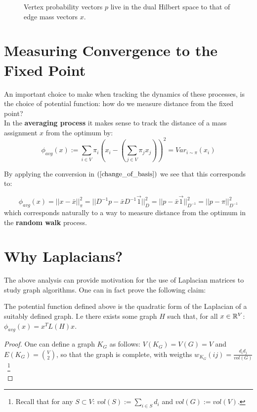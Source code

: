 \begin{figure}[h]
    \centering
    \caption{Vertex probability vectors $p$ live in the dual Hilbert space to that of edge mass vectors $x$.}
    \label{fig:my_label}
\end{figure}
\section{Measuring Convergence to the Fixed Point}
An important choice to make when tracking the dynamics of these processes, is the choice of potential function: how do we measure distance from the fixed point?\\

\noindent
In the \textbf{averaging process} it makes sense to track the distance of a mass assignment $x$ from the optimum by:
\[
    \phi_{avg}(x):= \sum_{i\in V} \pi_i \left(x_i - (\sum_{j \in V} \pi_j x_j)\right)^2 = Var_{i \sim \pi}(x_i)
\]

\noindent
By applying the conversion in $(\ref{change_of_basis})$ we see that this corresponds to:

\[
    \phi_{avg}(x) = ||x - \bar{x}||_{\pi}^2 = ||D^{-1}p - \bar{x} D^{-1}\vec{1} ||^2_D = ||p - \bar{x}\vec{1}||^2_{D^{-1}} = ||p-\pi||^2_{D^{-1}}
\]
which corresponds naturally to a way to measure distance from the optimum in the \textbf{random walk} process.

\section{Why Laplacians?}
The above analysis can provide motivation for the use of Laplacian matrices to study graph algorithms. One can in fact prove the following claim:
\begin{claim}
The potential function defined above is the quadratic form of the Laplacian of a suitably defined graph. I.e there exists some graph $H$ such that, for all $x \in \mathbb{R}^V$:
$\phi_{avg}(x) = x^TL(H)x$.
\end{claim}
\begin{proof}
One can define a graph $K_G$ as follows: $V(K_G) = V(G)= V$ and $E(K_G) = \binom{V}{2}$, so that the graph is complete, with weigths $w_{K_G}(ij) = \frac{d_id_j}{vol(G)}$~\footnote[1]{Recall that for any $S \subset V$: $vol(S):= \sum_{i \in S} d_i$ and $vol(G):= vol(V)$.}\\

\end{proof}

